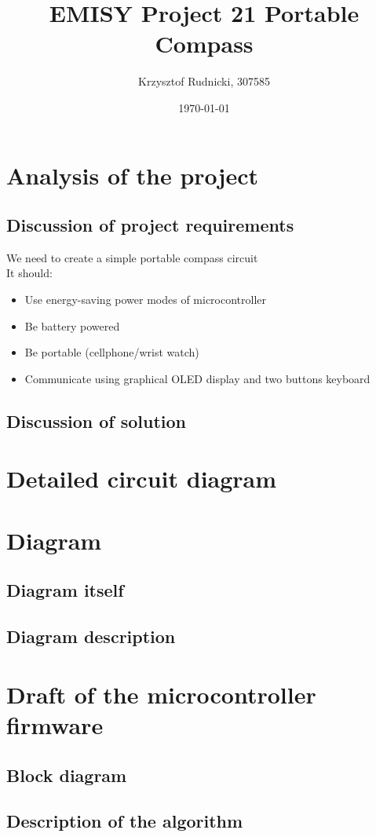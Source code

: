 \documentclass{article}
\title{EMISY Project 21 Portable Compass}
\author{Krzysztof Rudnicki, 307585}
\date{\today}
\begin{document}
\maketitle
\section{Analysis of the project}
\subsection{Discussion of project requirements}
We need to create a simple portable compass circuit \\
It should:
\begin{itemize}
	\item Use energy-saving power modes of microcontroller
	\item Be battery powered
	\item Be portable (cellphone/wrist watch)
	\item Communicate using graphical OLED display and two buttons keyboard
\end{itemize}
\subsection{Discussion of solution}
\section{Detailed circuit diagram}
\section{Diagram}
\subsection{Diagram itself}
\subsection{Diagram description}
\section{Draft of the microcontroller firmware}
\subsection{Block diagram}
\subsection{Description of the algorithm}
\end{document}
